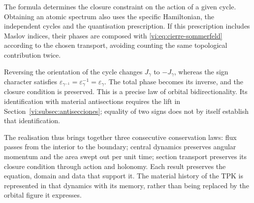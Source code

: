 The formula determines the closure constraint on the
action of a given cycle. Obtaining an atomic spectrum
also uses the specific Hamiltonian, the independent
cycles and the quantisation prescription. If this
prescription includes Maslov indices, their phases are
composed with \eqref{vi:eq:cierre-sommerfeld} according to the
chosen transport, avoiding counting the same
topological contribution twice.

Reversing the orientation of the cycle changes $J_\gamma$ to
$-J_\gamma$, whereas the sign character satisfies
$\varepsilon_{\gamma^{-1}}=\varepsilon_\gamma^{-1}
=\varepsilon_\gamma$. The total phase becomes its
inverse, and the closure condition is preserved. This is a
precise law of orbital bidirectionality. Its identification
with material antisections requires the lift
in Section~\ref{vi:subsec:antisecciones}; equality
of two signs does not by itself establish that identification.

The realisation thus brings together three consecutive
conservation laws: flux passes from the interior to the boundary;
central dynamics preserves angular momentum and the area
swept out per unit time; section transport
preserves its closure condition through action and
holonomy. Each result preserves the equation, domain
and data that support it. The material history of the
TPK is represented in that dynamics with its memory, rather
than being replaced by the orbital figure it expresses.
